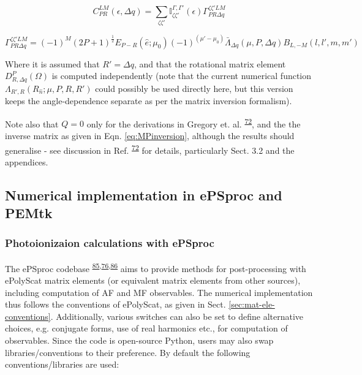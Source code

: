 \documentclass[10pt]{article}
\begin{document}
\begin{equation}
C_{PR}^{LM}(\epsilon,\Delta q)=\sum_{\zeta\zeta'}\mathbb{I}_{\zeta\zeta'}^{\Gamma,\Gamma'}(\epsilon)\Gamma_{PR\Delta q}^{\zeta\zeta'LM}
\end{equation}

\begin{equation}
\Gamma_{PR\Delta q}^{\zeta\zeta'LM}=(-1)^{M}(2P+1)^{\frac{1}{2}}E_{P-R}(\hat{e};\mu_{0})(-1)^{(\mu'-\mu_{0})}\bar{\Lambda}_{\Delta q}(\mu,P,\Delta q)B_{L,-M}(l,l',m,m')
\end{equation}

Where it is assumed that $R'=\Delta q$, and that the rotational matrix element $D_{R,\Delta q}^{P}(\Omega)$
is computed independently (note that the current numerical function $\Lambda_{R',R}(R_{\hat{n}};\mu,P,R,R')$
could possibly be used directly here, but this version keeps the angle-dependence
separate as per the matrix inversion formalism).

Note also that $Q=0$ only for the derivations in Gregory et. al. \textsuperscript{\hyperref[csl:72]{72}}, and the the inverse matrix as given in Eqn. \ref{eq:MPinversion}, although the results should generalise - see discussion in Ref. \textsuperscript{\hyperref[csl:72]{72}} for details, particularly Sect. 3.2 and the appendices.

\subsection{Numerical implementation in ePSproc and PEMtk\label{sec:numerical-notes}}

\subsubsection{Photoionizaion calculations with ePSproc}

The ePSproc codebase \textsuperscript{\hyperref[csl:85]{85},\hyperref[csl:76]{76},\hyperref[csl:86]{86}} aims to provide methods for post-processing with ePolyScat matrix elements (or equivalent matrix elements from other sources), including computation of AF and MF observables. The numerical implementation thus follows the conventions of ePolyScat, as given in Sect. \ref{sec:mat-ele-conventions}. Additionally, various switches can also be set to define alternative choices, e.g. conjugate forms, use of real harmonics etc., for computation of observables. Since the code is open-source Python, users may also swap libraries/conventions to their preference. By default the following conventions/libraries are used:
\end{document}
